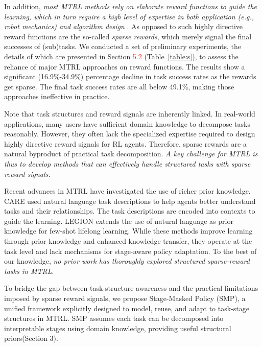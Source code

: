\documentclass{article}
\begin{document}
In addition, \emph{most MTRL methods rely on elaborate reward functions to guide the learning, which in turn require a high level of expertise in both application (e.g., robot mechanics) and algorithm design} \cite{q79,q80}.
As opposed to such highly directive reward functions are the so-called \emph{sparse rewards}, which merely signal the final successes of (sub)tasks.
We conducted a set of preliminary experiments, the details of which are presented in Section \textcolor{red}{5.2} (Table~\ref{table:s}), to assess the reliance of major MTRL approaches on reward functions.
The results show a significant (16.9\%-34.9\%) percentage decline in task success rates as the rewards get sparse.
The final task success rates are all below 49.1\%, making those approaches ineffective in practice.

Note that task structures and reward signals are inherently linked.
In real-world applications, many users have sufficient domain knowledge to decompose tasks reasonably.
However, they often lack the specialized expertise required to design highly directive reward signals for RL agents.
Therefore, sparse rewards are a natural byproduct of practical task decomposition.
\emph{A key challenge for MTRL is thus to develop methods that can effectively handle structured tasks with sparse reward signals.}

Recent advances in MTRL have investigated the use of richer prior knowledge.
CARE \cite{q69} used natural language task descriptions to help agents better understand tasks and their relationships.
The task descriptions are encoded into contexts to guide the learning.
LEGION \cite{q84} extends the use of natural language as prior knowledge for few-shot lifelong learning.
While these methods improve learning through prior knowledge and enhanced knowledge transfer, they operate at the task level and lack mechanisms for stage-aware policy adaptation.
To the best of our knowledge, \emph{no prior work has thoroughly explored structured sparse-reward tasks in MTRL}.


To bridge the gap between task structure awareness and the practical limitations imposed by sparse reward signals, we propose Stage-Masked Policy (SMP), a unified framework explicitly designed to model, reuse, and adapt to task-stage structures in MTRL. 
SMP assumes each task can be decomposed into interpretable stages using domain knowledge, providing useful structural priors(Section 3).
\end{document}
